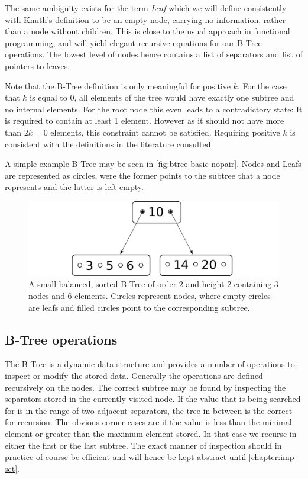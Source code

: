 The same ambiguity exists for the term \textit{Leaf} which we will define consistently with Knuth's definition \parencite{DBLP:books/lib/Knuth98a}
to be an empty node, carrying no information,
rather than a node without children.
This is close to the usual approach in functional programming,
and will yield elegant recursive equations for our B-Tree operations.
The lowest level of nodes hence contains a list of separators and
list of pointers to leaves.

Note that the B-Tree definition is only meaningful for positive $k$.
For the case that $k$ is equal to 0,
all elements of the tree would have exactly one subtree
and no internal elements.
For the root node this even leads to a contradictory state:
It is required to contain at least 1 element.
However as it should not have more than $2k = 0$ elements,
this constraint cannot be satisfied.
Requiring positive $k$ is consistent with the definitions
in the literature consulted \parencite{DBLP:journals/acta/BayerM72,DBLP:journals/csur/Comer79,DBLP:books/daglib/0023376}

A simple example B-Tree may be seen in \autoref{fig:btree-basic-nopair}.
Nodes and Leafs are represented as circles, were the former points to the
subtree that a node represents and the latter is left empty.

\begin{figure}
    \centering
    \includegraphics[width=0.5\linewidth]{figures/btree-basic-nopair.pdf}
    \caption{A small balanced, sorted B-Tree of order $2$ and
    height $2$ containing $3$ nodes and $6$ elements.
    Circles represent nodes, where empty circles are leafs and filled circles
    point to the corresponding subtree.}
    \label{fig:btree-basic-nopair}
\end{figure}

\subsection{B-Tree operations}

The B-Tree is a dynamic data-structure and provides
a number of operations to inspect or modify the stored data.
Generally the operations are defined recursively on the nodes.
The correct subtree may be found by inspecting the separators stored
in the currently visited node.
If the value that is being searched for is in the range of two
adjacent separators, the tree in between is the correct for recursion. 
The obvious corner cases are if the value is less than the
minimal element or greater than the maximum element stored.
In that case we recurse in either the first or the last subtree.
The exact manner of inspection should in practice of course
be efficient and will hence be kept abstract until \autoref{chapter:imp-set}.

